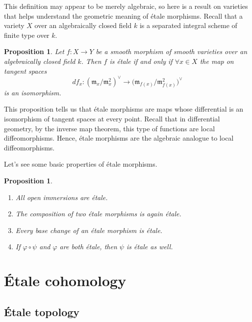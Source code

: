 \documentclass{report}
\newtheorem{proposition}[theorem]{Proposition}
\theoremstyle{definition}
\begin{document}
This definition may appear to be merely algebraic, so here is a result on varieties that helps understand the geometric meaning of \'{e}tale morphisms. Recall that a variety $X$ over an algebraically closed field $k$ is a separated integral scheme of finite type over $k$.

\begin{proposition}
Let $f:X\rightarrow Y$ be a smooth morphism of smooth varieties over an algebraically closed field $k$. Then $f$ is \'{e}tale if and only if $\forall x\in X$ the map on tangent spaces
\[df_x:(\mathfrak{m}_x/\mathfrak{m}_x^2)^{\vee}\longrightarrow\big(\mathfrak{m}_{f(x)}/\mathfrak{m}_{f(x)}^2\big)^{\vee}\]
is an isomorphism.
\end{proposition}

This proposition tells us that \'{e}tale morphisms are maps whose differential is an isomorphism of tangent spaces at every point. Recall that in differential geometry, by the inverse map theorem, this type of functions are local diffeomorphisms. Hence, \'{e}tale morphisms are the algebraic analogue to local diffeomorphisms.

Let's see some basic properties of \'{e}tale morphisms.

\begin{proposition}
\label{Pro:etale_properties}
\begin{enumerate}
\item\label{Pro:etale_properties:immersion} All open immersions are \'{e}tale.

\item The composition of two \'{e}tale morphisms is again \'{e}tale.

\item Every base change of an \'{e}tale morphism is \'{e}tale.

\item\label{Pro:etale_properties:component} If $\varphi\circ\psi$ and $\varphi$ are both \'{e}tale, then $\psi$ is \'{e}tale as well.
\end{enumerate}
\end{proposition}

\section{\'{E}tale cohomology}

\subsection{\'{E}tale topology}
\end{document}
